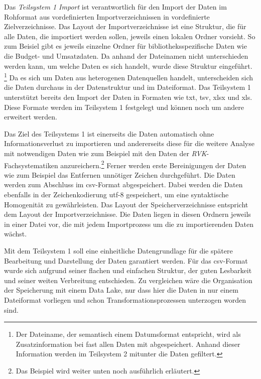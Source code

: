     Das \textit{Teilsystem 1 Import} ist verantwortlich für den Import der Daten im Rohformat aus vordefinierten Importverzeichnissen 
    in vordefinierte Zielverzeichnisse. Das Layout der Importverzeichnisse ist eine Struktur, die für alle Daten, die importiert werden sollen,
    jeweils einen lokalen Ordner vorsieht. So zum Beisiel gibt es jeweils einzelne Ordner für bibliotheksspezifische Daten wie die Budget- und Umsatzdaten.
    Da anhand der Dateinamen nicht unterschieden werden kann, um welche Daten es sich handelt, wurde diese Struktur eingeführt. 
    \footnote{ Der Dateiname, der semantisch einem Datumsformat entspricht, wird als Zusatzinformation bei fast allen Daten mit abgespeichert.
    Anhand dieser Information werden im Teilsystem 2 mitunter die Daten gefiltert.} 
    Da es sich um Daten aus heterogenen Datenquellen handelt, unterscheiden sich die Daten durchaus in der Datenstruktur und im Dateiformat. 
    Das Teilsystem 1 unterstützt bereits den Import der Daten in Formaten wie txt, tsv, xlsx und xls. Diese Formate werden im Teilsystem 1 festgelegt
    und können noch um andere erweitert werden.
    
    Das Ziel des Teilsystems 1 ist einerseits die Daten automatisch ohne Informationsverlust zu importieren 
    und andererseits diese für die weitere Analyse mit notwendigen Daten wie zum Beispiel mit den Daten 
    der \textit{\acrshort{RVK}}-Fachsystematiken anzureichern.\footnote{ Das Beispiel wird weiter unten noch ausführlich erläutert.}
    Ferner werden erste Bereinigungen der Daten wie zum Beispiel das Entfernen unnötiger Zeichen durchgeführt. Die Daten werden zum Abschluss im csv-Format abgespeichert. 
    Dabei werden die Daten ebenfalls in der Zeichenkodierung utf-8 gespeichert, um eine syntaktische Homogenität zu gewährleisten. Das Layout der Speicherverzeichnisse
    entspricht dem Layout der Importverzeichnisse. Die Daten liegen in diesen Ordnern jeweils in einer Datei vor, die mit jedem Importprozess um die zu importierenden Daten wächst.

    Mit dem Teilsystem 1 soll eine einheitliche Datengrundlage für die spätere Bearbeitung und Darstellung der Daten garantiert werden. Für das csv-Format wurde sich aufgrund seiner flachen und einfachen Struktur, der guten Lesbarkeit
    und seiner weiten Verbreitung entschieden. Zu vergleichen wäre die Organisation der Speicherung mit einem Data Lake, nur dass hier die Daten in nur einem Dateiformat vorliegen und schon Transformationsprozessen unterzogen worden sind.
    
